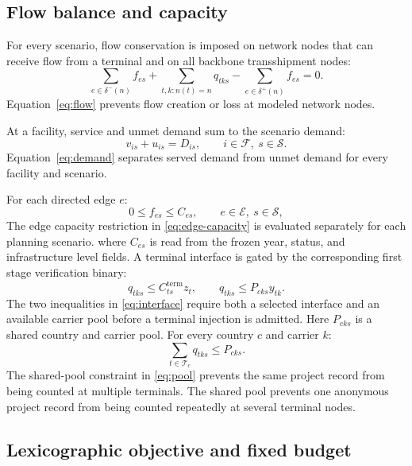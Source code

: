 \documentclass{ieeeaccess}
\begin{document}
\subsection{Flow balance and capacity}

For every scenario, flow conservation is imposed on network nodes that can receive flow from a terminal and on all backbone transshipment nodes:
\begin{equation}
\sum_{e\in\delta^-(n)}f_{es}+\sum_{t,k:n(t)=n}q_{tks}
-\sum_{e\in\delta^+(n)}f_{es}=0.
\label{eq:flow}
\end{equation}
Equation~\eqref{eq:flow} prevents flow creation or loss at modeled network nodes.

At a facility, service and unmet demand sum to the scenario demand:
\begin{equation}
v_{is}+u_{is}=D_{is},\qquad i\in\mathcal{F},\ s\in\mathcal{S}.
\label{eq:demand}
\end{equation}
Equation~\eqref{eq:demand} separates served demand from unmet demand for every facility and scenario.

For each directed edge $e$:
\begin{equation}
0\leq f_{es}\leq C_{es},\qquad e\in\mathcal{E},\ s\in\mathcal{S},
\label{eq:edge-capacity}
\end{equation}
The edge capacity restriction in \eqref{eq:edge-capacity} is evaluated separately for each planning scenario.
where $C_{es}$ is read from the frozen year, status, and infrastructure level fields. A terminal interface is gated by the corresponding first stage verification binary:
\begin{equation}
q_{tks}\leq C^{\mathrm{term}}_{ts}z_t,\qquad
q_{tks}\leq P_{cks}y_{tk}.
\label{eq:interface}
\end{equation}
The two inequalities in \eqref{eq:interface} require both a selected interface and an available carrier pool before a terminal injection is admitted.
Here $P_{cks}$ is a shared country and carrier pool. For every country $c$ and carrier $k$:
\begin{equation}
\sum_{t\in\mathcal{T}_c}q_{tks}\leq P_{cks}.
\label{eq:pool}
\end{equation}
The shared-pool constraint in \eqref{eq:pool} prevents the same project record from being counted at multiple terminals.
The shared pool prevents one anonymous project record from being counted repeatedly at several terminal nodes.

\subsection{Lexicographic objective and fixed budget}
\end{document}
